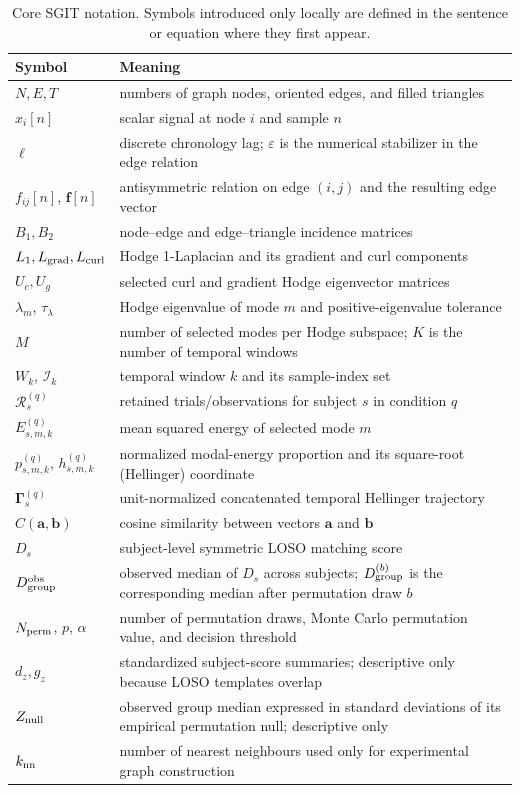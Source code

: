 \documentclass[12pt]{article}
\begin{document}
\begin{table}[p]
\centering\small
\caption{Core SGIT notation. Symbols introduced only locally are defined in the sentence or equation where they first appear.}
\label{tab:notation}
\begin{tabularx}{\textwidth}{@{}lX@{}}
\toprule
Symbol & Meaning\\
\midrule
$N,E,T$ & numbers of graph nodes, oriented edges, and filled triangles\\
$x_i[n]$ & scalar signal at node $i$ and sample $n$\\
$\ell$ & discrete chronology lag; $\varepsilon$ is the numerical stabilizer in the edge relation\\
$f_{ij}[n]$, $\bm f[n]$ & antisymmetric relation on edge $(i,j)$ and the resulting edge vector\\
$B_1,B_2$ & node--edge and edge--triangle incidence matrices\\
$L_1,L_{\rm grad},L_{\rm curl}$ & Hodge 1-Laplacian and its gradient and curl components\\
$U_c,U_g$ & selected curl and gradient Hodge eigenvector matrices\\
$\lambda_m$, $\tau_\lambda$ & Hodge eigenvalue of mode $m$ and positive-eigenvalue tolerance\\
$M$ & number of selected modes per Hodge subspace; $K$ is the number of temporal windows\\
$W_k$, $\mathcal I_k$ & temporal window $k$ and its sample-index set\\
$\mathcal R_s^{(q)}$ & retained trials/observations for subject $s$ in condition $q$\\
$E_{s,m,k}^{(q)}$ & mean squared energy of selected mode $m$\\
$p_{s,m,k}^{(q)}$, $h_{s,m,k}^{(q)}$ & normalized modal-energy proportion and its square-root (Hellinger) coordinate\\
$\bm\Gamma_s^{(q)}$ & unit-normalized concatenated temporal Hellinger trajectory\\
$C(\bm a,\bm b)$ & cosine similarity between vectors $\bm a$ and $\bm b$\\
$D_s$ & subject-level symmetric LOSO matching score\\
$D_{\rm group}^{\rm obs}$ & observed median of $D_s$ across subjects; $D_{\rm group}^{(b)}$ is the corresponding median after permutation draw $b$\\
$N_{\rm perm}$, $p$, $\alpha$ & number of permutation draws, Monte Carlo permutation value, and decision threshold\\
$d_z,g_z$ & standardized subject-score summaries; descriptive only because LOSO templates overlap\\
$Z_{\rm null}$ & observed group median expressed in standard deviations of its empirical permutation null; descriptive only\\
$k_{\rm nn}$ & number of nearest neighbours used only for experimental graph construction\\
\bottomrule
\end{tabularx}
\end{table}
\end{document}
